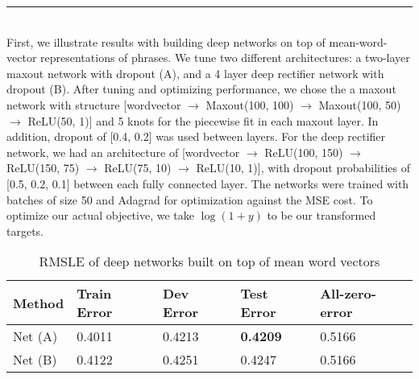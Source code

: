 \documentclass[a0]{a0poster}
\def\Head#1{\noindent{\LARGE\color{bluegray} #1}\bigskip}
\begin{document}
\begin{textblock}{7.0}
\medskip
\hrule\medskip
\Head{Deep Feedforward Results}\\
First, we illustrate results with building deep networks on top of mean-word-vector representations of phrases. We tune two different architectures: a two-layer maxout network with dropout (A), and a 4 layer deep rectifier network with dropout (B). After tuning and optimizing performance, we chose the a maxout network with structure [wordvector $\rightarrow$ Maxout(100, 100) $\rightarrow$ Maxout(100, 50) $\rightarrow$ ReLU(50, 1)] and 5 knots for the piecewise fit in each maxout layer. In addition, dropout of [0.4, 0.2] was used between layers. For the deep rectifier network, we had an architecture of [wordvector $\rightarrow$ ReLU(100, 150) $\rightarrow$ ReLU(150, 75) $\rightarrow$ ReLU(75, 10) $\rightarrow$ ReLU(10, 1)], with dropout probabilities of [0.5, 0.2, 0.1] between each fully connected layer. The networks were trained with batches of size 50 and Adagrad for optimization against the MSE cost. To optimize our actual objective, we take $\log(1 + y)$ to be our transformed targets.
\begin{table}[h]
\centering
\vspace{2ex}
\begin{tabular}{l l l l l}
\textbf{Method} & \textbf{Train Error} & \textbf{Dev Error} & \textbf{Test Error} & \textbf{All-zero-error}\tabularnewline
\hline
Net (A) & 0.4011 &  0.4213 & \textbf{0.4209} & 0.5166\tabularnewline
\hline
Net (B) & 0.4122 & 0.4251 & 0.4247 & 0.5166\tabularnewline
\hline
\end{tabular}
\caption{RMSLE of deep networks built on top of mean word vectors}
\end{table}

\end{textblock}
\end{document}
